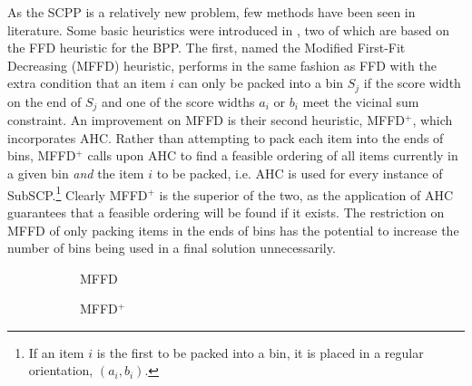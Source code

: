 \documentclass[authoryear]{elsarticle}
\begin{document}
As the SCPP is a relatively new problem, few methods have been seen in literature. Some basic heuristics were introduced in \citet{hawa2018}, two of which are based on the FFD heuristic for the BPP. The first, named the Modified First-Fit Decreasing (MFFD) heuristic, performs in the same fashion as FFD with the extra condition that an item $i$ can only be packed into a bin $S_j$ if the score width on the end of $S_j$ and one of the score widths $a_i$ or $b_i$ meet the vicinal sum constraint. An improvement on MFFD is their second heuristic, MFFD$^+$, which incorporates AHC. Rather than attempting to pack each item into the ends of bins, MFFD$^+$ calls upon AHC to find a feasible ordering of all items currently in a given bin \emph{and} the item $i$ to be packed, i.e. AHC is used for every instance of SubSCP.\footnote{If an item $i$ is the first to be packed into a bin, it is placed in a regular orientation, $(a_i, b_i)$.} Clearly MFFD$^+$ is the superior of the two, as the application of AHC guarantees that a feasible ordering will be found if it exists. The restriction on MFFD of only packing items in the ends of bins has the potential to increase the number of bins being used in a final solution unnecessarily. 

\begin{figure}[H]	
	\centering
	\begin{subfigure}[h]{0.4\textwidth}
		
		\caption{MFFD}
		\label{fig:mffd}
	\end{subfigure} \hspace{10mm}
	\begin{subfigure}[h]{0.4\textwidth}
		
		\caption{MFFD$^+$}
		\label{fig:mffdplus}
	\end{subfigure}
	\caption{}
	\label{fig:mffdvsmffdplus}
\end{figure}
\end{document}
